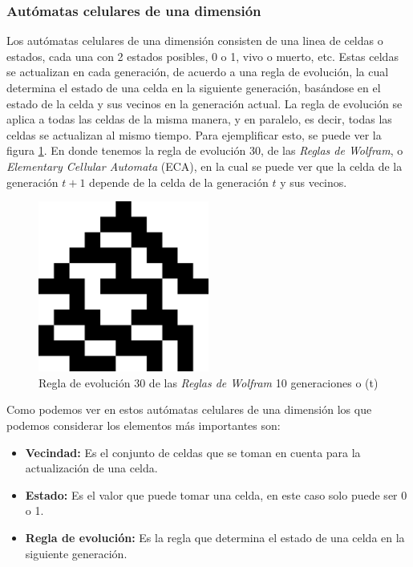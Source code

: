 \subsubsection{Aut\'omatas celulares de una dimensi\'on}
\label{sec:AutomatasCel1D}
    Los aut\'omatas celulares de una dimensi\'on consisten de una linea de celdas o estados, cada una con 2 estados posibles, 
        0 o 1, vivo o muerto, etc. Estas celdas se actualizan en cada generaci\'on, de acuerdo a una regla de evoluci\'on, 
        la cual determina el estado de una celda en la siguiente generaci\'on, bas\'andose en el estado de la celda y sus 
        vecinos en la generaci\'on actual. La regla de evoluci\'on se aplica a todas las celdas de la misma manera, y en 
        paralelo, es decir, todas las celdas se actualizan al mismo tiempo. Para ejemplificar esto, se puede ver la figura
        \ref{fig:automataCelular1D}. En donde tenemos la regla de evoluci\'on 30, de las \textit{Reglas de Wolfram}\cite{Wolfram1959}, o
        \textit{Elementary Cellular Automata} (ECA), en la cual se puede ver que la celda de la generaci\'on $t+1$ depende
        de la celda de la generaci\'on $t$ y sus vecinos.
        \begin{figure}[h!]
            \centering
            \includegraphics[width=0.5\textwidth]{./images/marco_teorico/automatas_celulares/Regla30.png}
            \caption{Regla de evoluci\'on 30 de las \textit{Reglas de Wolfram} 10 generaciones o (t)}
            \label{fig:automataCelular1D}
        \end{figure}
    \vskip 0.5cm
    Como podemos ver en estos aut\'omatas celulares de una dimensi\'on los que podemos considerar los elementos m\'as importantes son:
        \begin{itemize}
            \item \textbf{Vecindad:} Es el conjunto de celdas que se toman en cuenta para la actualizaci\'on de una celda.
            \item \textbf{Estado:} Es el valor que puede tomar una celda, en este caso solo puede ser 0 o 1.
            \item \textbf{Regla de evoluci\'on:} Es la regla que determina el estado de una celda en la siguiente generaci\'on.
        \end{itemize}
